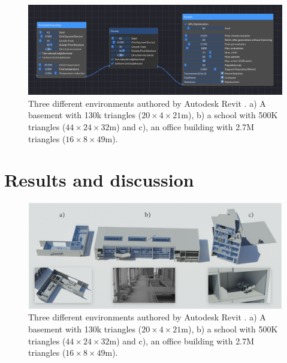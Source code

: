 \begin{figure}[ht]
    \centering
    \includegraphics[width=\linewidth]{figs/lidar_optimization/optimization_node_editor.png}
	\caption{Three different environments authored by Autodesk Revit \textregistered \hspace{.5mm}. a) A basement with 130k triangles ($20 \times 4 \times 21$\si{\meter}), b) a school with 500K triangles ($44 \times 24 \times 32$\si{\meter}) and c), an office building with 2.7M triangles ($16 \times 8 \times 49$\si{\meter}). }
	\label{fig:optimization_node_editor}
\end{figure}

\section{Results and discussion}

\begin{figure}
    \centering
    \includegraphics[width=\linewidth]{figs/lidar_optimization/evaluation_scenes.png}
	\caption{Three different environments authored by Autodesk Revit \textregistered \hspace{.5mm}. a) A basement with 130k triangles ($20 \times 4 \times 21$\si{\meter}), b) a school with 500K triangles ($44 \times 24 \times 32$\si{\meter}) and c), an office building with 2.7M triangles ($16 \times 8 \times 49$\si{\meter}). }
	\label{fig:bim_environments}
\end{figure}

